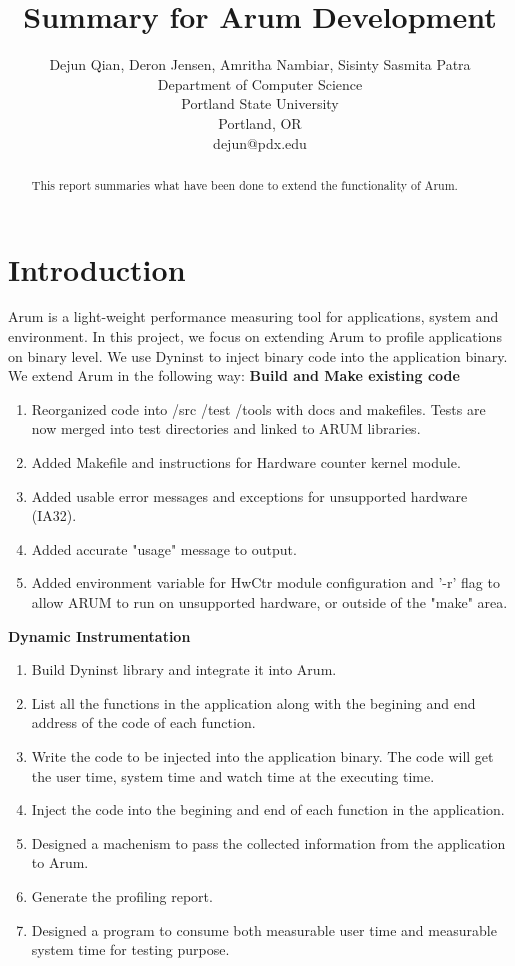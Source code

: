 \documentclass[11pt,letterpaper,oneside]{article}
\title{Summary for Arum Development}
\author{Dejun Qian, Deron Jensen, Amritha Nambiar, Sisinty Sasmita Patra\\Department of Computer Science\\Portland State University\\Portland, OR\\dejun@pdx.edu}
\begin{document}
\maketitle

\begin{abstract}
This report summaries what have been done to extend the functionality of Arum.
\end{abstract}

\section{Introduction}
Arum is a light-weight performance measuring tool for applications, system and environment. In this project, we focus on extending Arum to profile applications on binary level. We use Dyninst to inject binary code into the application binary. We extend Arum in the following way:
\newline
\textbf{Build and Make existing code}
\begin{enumerate}
\item Reorganized code into /src /test /tools with docs and makefiles.  Tests are now merged into test directories and linked to ARUM libraries.
\item Added Makefile and instructions for Hardware counter kernel module.
\item Added usable error messages and exceptions for unsupported hardware (IA32).
\item Added accurate "usage" message to output.
\item Added environment variable for HwCtr module configuration and '-r' flag to allow ARUM to run on unsupported hardware, or outside of the "make" area.
\end{enumerate}
\textbf{Dynamic Instrumentation}
\begin{enumerate}
\item Build Dyninst library and integrate it into Arum.
\item List all the functions in the application along with the begining and end address of the code of each function.
\item Write the code to be injected into the application binary. The code will get the user time, system time and watch time at the executing time.
\item Inject the code into the begining and end of each function in the application.
\item Designed a machenism to pass the collected information from the application to Arum.
\item Generate the profiling report.
\item Designed a program to consume both measurable user time and measurable system time for testing purpose.
\end{enumerate}
\end{document}
